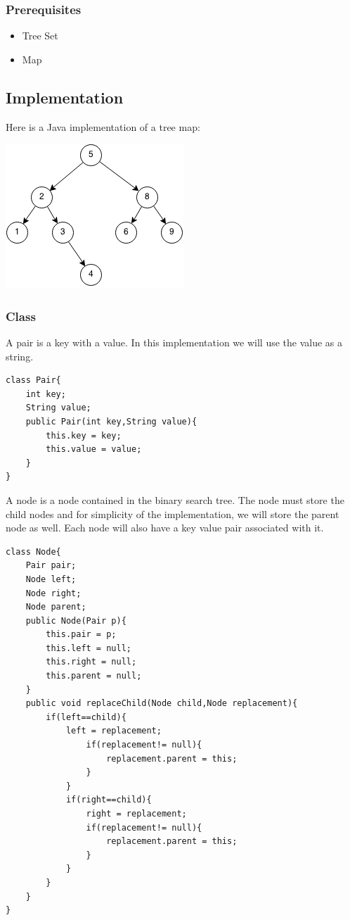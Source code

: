 \documentclass[11pt,oneside]{book}
\makeatletter
\def\maxwidth#1{\ifdim\Gin@nat@width>#1 #1\else\Gin@nat@width\fi}
\makeatother
\begin{document}
\subsubsection{Prerequisites}

\begin{itemize}
\item Tree Set
\item Map
\end{itemize}

\subsection{Implementation}

Here is a Java implementation of a tree map:

\includegraphics[width=\maxwidth{\textwidth}]{bst.png}

\subsubsection{Class}

A pair is a key with a value. In this implementation we will use the value as a string.

\begin{lstlisting}
class Pair{
    int key;
    String value;
    public Pair(int key,String value){
        this.key = key;
        this.value = value;
    }
}
\end{lstlisting}

A node is a node contained in the binary search tree. The node must store the child nodes and for simplicity of the implementation, we will store the parent node as well. Each node will also have a key value pair associated with it.

\begin{lstlisting}
class Node{
    Pair pair;
    Node left;
    Node right;
    Node parent;
    public Node(Pair p){
        this.pair = p;
        this.left = null;
        this.right = null;
        this.parent = null;
    }
    public void replaceChild(Node child,Node replacement){
        if(left==child){
            left = replacement;
                if(replacement!= null){
                    replacement.parent = this;
                }
            }
            if(right==child){
                right = replacement;
                if(replacement!= null){
                    replacement.parent = this;
                }
            }
        }
    }
}
\end{lstlisting}
\end{document}
